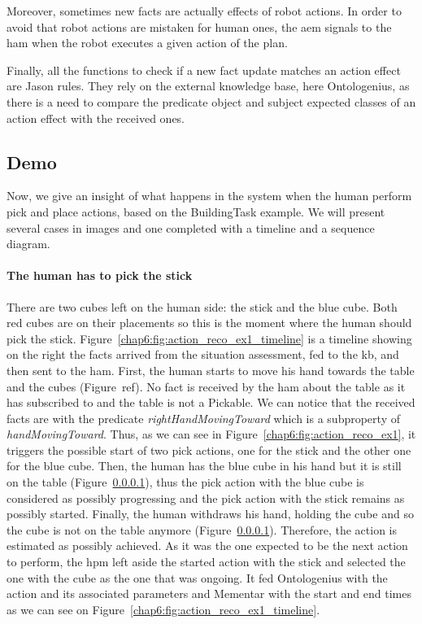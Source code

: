 \documentclass[a4paper,11pt,twoside]{StyleThese}
\begin{document}
Moreover, sometimes new facts are actually effects of robot actions. In order to avoid that robot actions are mistaken for human ones, the \acrshort{aem} signals to the \acrlong{ham} when the robot executes a given action of the plan. 

Finally, all the functions to check if a new fact update matches an action effect are Jason rules. They rely on the external knowledge base, here Ontologenius, as there is a need to compare the predicate object and subject expected classes of an action effect with the received ones.

\thispagestyle{example}
\subsection*{Demo}
Now, we give an insight of what happens in the system when the human perform pick and place actions, based on the BuildingTask example. We will present several cases in images and one completed with a timeline and a sequence diagram.

\paragraph{The human has to pick the stick} There are two cubes left on the human side: the stick and the blue cube. Both red cubes are on their placements so this is the moment where the human should pick the stick. Figure~\ref{chap6:fig:action_reco_ex1_timeline} is a timeline showing on the right the facts arrived from the situation assessment, fed to the \acrshort{kb}, and then sent to the \acrshort{ham}. First, the human starts to move his hand towards the table and the cubes (Figure~ref{}). No fact is received by the \acrshort{ham} about the table as it has subscribed to  and the table is not a Pickable. We can notice that the received facts are with the predicate \textit{rightHandMovingToward} which is a subproperty of \textit{handMovingToward}. Thus, as we can see in Figure~\ref{chap6:fig:action_reco_ex1}, it triggers the possible start of two pick actions, one for the stick and the other one for the blue cube. Then, the human has the blue cube in his hand but it is still on the table (Figure~\ref{}), thus the pick action with the blue cube is considered as possibly progressing and the pick action with the stick remains as possibly started. Finally, the human withdraws his hand, holding the cube and so the cube is not on the table anymore (Figure~\ref{}). Therefore, the action is estimated as possibly achieved. As it was the one expected to be the next action to perform, the \acrlong{hpm} left aside the started action with the stick and selected the one with the cube as the one that was ongoing. It fed Ontologenius with the action and its associated parameters and Mementar with the start and end times as we can see on Figure~\ref{chap6:fig:action_reco_ex1_timeline}.
\end{document}

